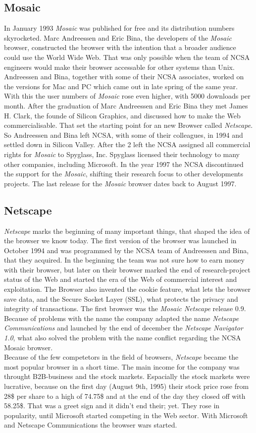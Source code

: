\documentclass[runningheads]{llncs}
\begin{document}
\subsection{Mosaic}
In January 1993 \textit{Mosaic} was published for free and its distribution numbers skyrocketed. Marc Andreessen and Eric Bina, the developers of the \textit{Mosaic} browser, constructed the browser with the intention that a broader audience could use the World Wide Web. That was only possible when the team of NCSA engineers would make their browser accessable for other systems than Unix. Andreessen and Bina, together with some of their NCSA associates, worked on the versions for Mac and PC which came out in late spring of the same year. With this the user numbers of \textit{Mosaic} rose even higher, with 5000 downloads per month. After the graduation of Marc Andreessen and Eric Bina they met James H. Clark, the founde of Silicon Graphics, and discussed how to make the Web commercialisable. That set the starting point for an new Browser called \textit{Netscape}. So Andreessen and Bina left NCSA, with some of their colleagues, in 1994 and settled down in Silicon Valley. After the 2 left the NCSA assigned all commercial rights for \textit{Mosaic} to Spyglass, Inc. Spyglass licensed their technology to many other companies, including Microsoft. In the year 1997 the NCSA discontinued the support for the \textit{Mosaic}, shifting their research focus to other developments projects. The last release for the \textit{Mosaic} browser dates back to August 1997.
\subsection{Netscape}
\textit{Netscape} marks the beginning of many important things, that shaped the idea of the browser we know today. The first version of the browser was launched in October 1994 and was programmed by the NCSA team of Andreessen and Bina, that they acquired. In the beginning the team was not sure how to earn money with their browser, but later on their browser marked the end of research-project status of the Web and started the era of the Web of commercial interest and exploitation. The Browser also invented the cookie feature, what lets the browser save data, and the Secure Socket Layer (SSL), what protects the privacy  and integrity of transactions. The first browser was the \textit{Mosaic Netscape} release 0.9. Because of problems with the name the company adapted the name \textit{Netscape Communications} and launched by the end of december the \textit{Netscape Navigator 1.0}, what also solved the problem with the name conflict regarding the NCSA Mosaic browser.
\\Because of the few competetors in the field of browsers, \textit{Netscape} became the most popular browser in a short time. The main income for the company was throught B2B-business and the stock markets. Espacially the stock markets were lucrative, because on the first day (August 9th, 1995) their stock price rose from 28\$ per share to a high of 74.75\$ and at the end of the day they closed off with 58.25\$. That was a greet sign and it didn't end their; yet. They rose in popularity, until Microsoft started competing in the Web sector. With Microsoft and Netscape Communications the browser wars started.
\end{document}

